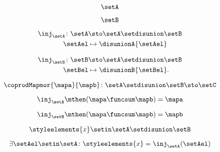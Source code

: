 \begin{forslides}
    \begin{equation}
        \label{eq:feedback-096}
        \setA
    \end{equation}

    \begin{equation}
        \label{eq:feedback-097}
        \setB
    \end{equation}

    \begin{equation}
        \label{eq:feedback-098}
        \begin{aligned}
            \inj_\setA\colon \setA & \sto \setA\setdisunion\setB \\
            \setAel                & \mapsto \disunionA{\setAel}
        \end{aligned} \end{equation}

    \begin{equation}
        \label{eq:feedback-099}
        \begin{aligned}
            \inj_\setB\colon \setB & \sto \setA\setdisunion\setB \\
            \setBel                & \mapsto \disunionB{\setBel}.
        \end{aligned}    \end{equation}

    \begin{equation}
        \label{eq:feedback-100}
        \coprodMapmor{\mapa}{\mapb}\colon \setA \setdisunion \setB \sto \setC
    \end{equation}

    \begin{equation}
        \label{eq:feedback-101}
        \inj_\setA\mthen (\mapa \funcsum \mapb)=\mapa
    \end{equation}

    \begin{equation}
        \label{eq:feedback-102}
        \inj_\setB\mthen (\mapa \funcsum \mapb)=\mapb
    \end{equation}

    \begin{equation}
        \label{eq:feedback-103}
        \styleelements{x}\setin \setA \setdisunion \setB
    \end{equation}

    \begin{equation}
        \label{eq:feedback-104}
        \exists \setAel\setin \setA\colon \styleelements{x}=\inj_\setA(\setAel)
    \end{equation}


\end{forslides}
